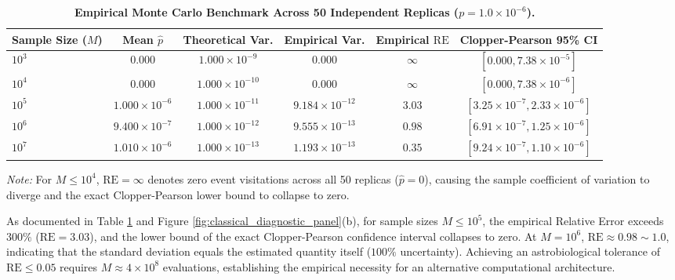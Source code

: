 \begin{table}[htbp]
\centering
\caption{\textbf{Empirical Monte Carlo Benchmark Across 50 Independent Replicas ($p = 1.0 \times 10^{-6}$).}}
\label{tab:classical_replica_benchmark}
\begin{adjustbox}{max width=\textwidth}
\small
\begin{tabular}{lccccc}
\toprule
\textbf{Sample Size ($M$)} & \textbf{Mean $\hat{p}$} & \textbf{Theoretical Var.} & \textbf{Empirical Var.} & \textbf{Empirical $\mathrm{RE}$} & \textbf{Clopper-Pearson 95\% CI} \\
\midrule
$10^3$ & $0.000$ & $1.000 \times 10^{-9}$ & $0.000$ & $\infty$ & $[0.000, 7.38 \times 10^{-5}]$ \\
$10^4$ & $0.000$ & $1.000 \times 10^{-10}$ & $0.000$ & $\infty$ & $[0.000, 7.38 \times 10^{-6}]$ \\
$10^5$ & $1.000 \times 10^{-6}$ & $1.000 \times 10^{-11}$ & $9.184 \times 10^{-12}$ & $3.03$ & $[3.25 \times 10^{-7}, 2.33 \times 10^{-6}]$ \\
$10^6$ & $9.400 \times 10^{-7}$ & $1.000 \times 10^{-12}$ & $9.555 \times 10^{-13}$ & $0.98$ & $[6.91 \times 10^{-7}, 1.25 \times 10^{-6}]$ \\
$10^7$ & $1.010 \times 10^{-6}$ & $1.000 \times 10^{-13}$ & $1.193 \times 10^{-13}$ & $0.35$ & $[9.24 \times 10^{-7}, 1.10 \times 10^{-6}]$ \\
\bottomrule
\end{tabular}
\end{adjustbox}
\vspace{1ex}
{\footnotesize \emph{Note:} For $M \le 10^4$, $\mathrm{RE} = \infty$ denotes zero event visitations across all 50 replicas ($\hat{p} = 0$), causing the sample coefficient of variation to diverge and the exact Clopper-Pearson lower bound to collapse to zero.}
\end{table}

As documented in Table \ref{tab:classical_replica_benchmark} and Figure \ref{fig:classical_diagnostic_panel}(b), for sample sizes $M \le 10^5$, the empirical Relative Error exceeds $300\%$ ($\mathrm{RE} = 3.03$), and the lower bound of the exact Clopper-Pearson confidence interval collapses to zero. At $M = 10^6$, $\mathrm{RE} \approx 0.98 \sim 1.0$, indicating that the standard deviation equals the estimated quantity itself ($100\%$ uncertainty). Achieving an astrobiological tolerance of $\mathrm{RE} \le 0.05$ requires $M \approx 4 \times 10^8$ evaluations, establishing the empirical necessity for an alternative computational architecture.

